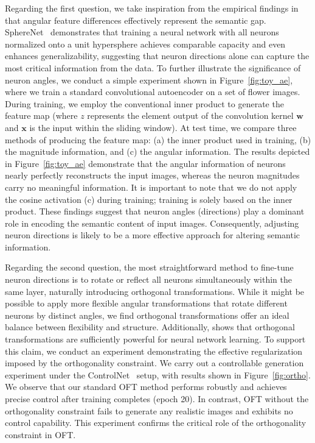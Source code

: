 Regarding the first question, we take inspiration from the empirical findings in \cite{liu2018decoupled,chen2020angular} that angular feature differences effectively represent the semantic gap. SphereNet~\cite{liu2017deep} demonstrates that training a neural network with all neurons normalized onto a unit hypersphere achieves comparable capacity and even enhances generalizability, suggesting that neuron directions alone can capture the most critical information from the data. To further illustrate the significance of neuron angles, we conduct a simple experiment shown in Figure~\ref{fig:toy_ae}, where we train a standard convolutional autoencoder on a set of flower images. During training, we employ the conventional inner product to generate the feature map (where $z$ represents the element output of the convolution kernel $\bm{w}$ and $\bm{x}$ is the input within the sliding window). At test time, we compare three methods of producing the feature map: (a) the inner product used in training, (b) the magnitude information, and (c) the angular information. The results depicted in Figure~\ref{fig:toy_ae} demonstrate that the angular information of neurons nearly perfectly reconstructs the input images, whereas the neuron magnitudes carry no meaningful information. It is important to note that we do not apply the cosine activation (c) during training; training is solely based on the inner product. These findings suggest that neuron angles (directions) play a dominant role in encoding the semantic content of input images. Consequently, adjusting neuron directions is likely to be a more effective approach for altering semantic information.

Regarding the second question, the most straightforward method to fine-tune neuron directions is to rotate or reflect all neurons simultaneously within the same layer, naturally introducing orthogonal transformations. While it might be possible to apply more flexible angular transformations that rotate different neurons by distinct angles, we find orthogonal transformations offer an ideal balance between flexibility and structure. Additionally, \cite{liu2021orthogonal} shows that orthogonal transformations are sufficiently powerful for neural network learning. To support this claim, we conduct an experiment demonstrating the effective regularization imposed by the orthogonality constraint. We carry out a controllable generation experiment under the ControlNet~\cite{zhang2023adding} setup, with results shown in Figure~\ref{fig:ortho}. We observe that our standard OFT method performs robustly and achieves precise control after training completes (epoch 20). In contrast, OFT without the orthogonality constraint fails to generate any realistic images and exhibits no control capability. This experiment confirms the critical role of the orthogonality constraint in OFT.

